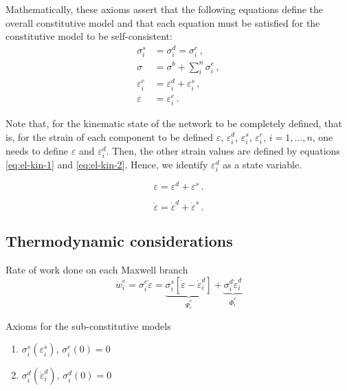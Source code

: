 \documentclass[12pt]{article}
\begin{document}
Mathematically, these axioms assert that the following equations define the overall constitutive model and that each equation must be satisfied for the constitutive model to be self-consistent:
\begin{align}
	\sigma^{s}_{i} &= \sigma^{d}_{i} = \sigma^{e}_{i}\,,\\
	\sigma & = \sigma^{b} + \sum_{i}^{n}\sigma^{e}_{i}\,,\\
	\varepsilon^{e}_{i} &= \varepsilon^{d}_{i} + \varepsilon^{s}_{i}\,,\label{eq:el-kin-1}\\
	\varepsilon& = \varepsilon^{e}_{i} \,.\label{eq:el-kin-2}
\end{align}

Note that, for the kinematic state of the network to be completely defined, that is, for the strain of each component to be defined $\varepsilon$, $\varepsilon^{d}_{i}$, $\varepsilon^{s}_{i}$, $\varepsilon^{e}_{i}$, $i=1,...,n$, one needs to define $\varepsilon$ and $\varepsilon^{d}_{i}$. Then, the other strain values are defined by equations \eqref{eq:el-kin-1} and \eqref{eq:el-kin-2}. Hence, we identify $\varepsilon^{d}_{i}$ as a state variable. 

\begin{equation}
		\varepsilon = \varepsilon^{d} + \varepsilon^{s}\,.
\end{equation}

\begin{equation}
	\dot{\varepsilon } = \dot{\varepsilon}^{d} + \dot{\varepsilon}^{s}\,.
\end{equation}

\subsection{Thermodynamic considerations}


Rate of work done on each Maxwell branch
\begin{equation}
	\dot{w}^{e}_{i} = \sigma^{e}_{i}\dot{\varepsilon} = \underbrace{\sigma^{s}_{i}\left[\dot{\varepsilon}-\dot{\varepsilon}_{i}^{d}\right]}_{\dot{\Psi}^{e}_{i}} + \underbrace{\sigma^{d}_{i}\dot{\varepsilon}_{i}^{d}}_{\dot{\Phi}^{e}_{i}}
\end{equation}

Axioms for the sub-constitutive models
\begin{enumerate}
	\item $\sigma^{s}_{i}(\varepsilon^{s}_{i})$, $\sigma^{e}_{i}(0) = 0$
	\item $\sigma^{d}_{i}\left(\dot{\varepsilon}^{d}_{i}\right)$,  $\sigma^{d}_{i}\left(0\right) = 0$ 
\end{enumerate}
\end{document}
